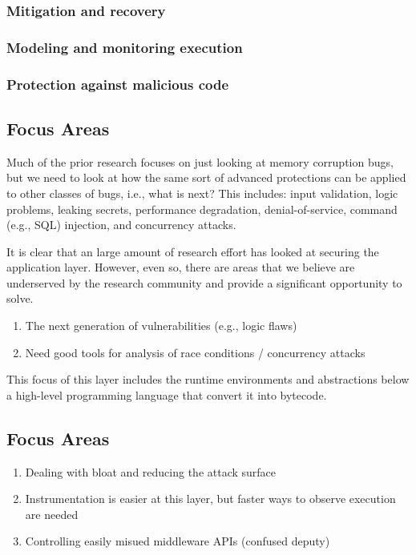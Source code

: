 \documentclass[11pt,letterpaper]{article}
\begin{document}
\subsubsection{Mitigation and recovery}

\subsubsection{Modeling and monitoring execution}

\subsubsection{Protection against malicious code}

\subsection{Focus Areas}

Much of the prior research focuses on just looking at memory
corruption bugs, but we need to look at how the same sort of advanced
protections can be applied to other classes of bugs, i.e., what is
next? This includes: input validation, logic problems, leaking
secrets, performance degradation, denial-of-service, command (e.g.,
SQL) injection, and concurrency attacks.


It is clear that an large amount of research effort has looked at
securing the application layer. However, even so, there are areas that
we believe are underserved by the research community and provide a
significant opportunity to solve.

\begin{enumerate}
	\item The next generation of vulnerabilities (e.g., logic flaws)
	\item Need good tools for analysis of race conditions / concurrency attacks
\end{enumerate}

This focus of this layer includes the runtime environments and abstractions
below a high-level programming language that convert it into bytecode.

\subsection{Focus Areas}

\begin{enumerate}
	\item Dealing with bloat and reducing the attack surface
	\item Instrumentation is easier at this layer, but faster ways to observe execution are needed
	\item Controlling easily misued middleware APIs (confused deputy)
\end{enumerate}
\end{document}
